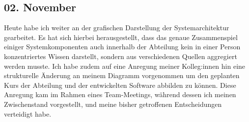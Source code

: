 \subsection{02. November}
Heute habe ich weiter an der grafischen Darstellung der Systemarchitektur gearbeitet. Es hat sich hierbei herausgestellt, dass das genaue Zusammenspiel einiger Systemkomponenten auch innerhalb der Abteilung kein in einer Person konzentriertes Wissen darstellt, sondern aus verschiedenen Quellen aggregiert werden musste. Ich habe zudem auf eine Anregung meiner Kolleg:innen hin eine strukturelle Änderung an meinem Diagramm vorgenommen um den geplanten Kurs der Abteilung und der entwickelten Software abbilden zu können. Diese Anregung kam im Rahmen eines Team-Meetings, während dessen ich meinen Zwischenstand vorgestellt, und meine bisher getroffenen Entscheidungen verteidigt habe. 